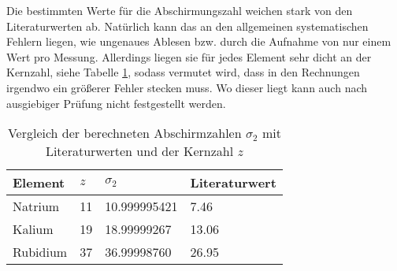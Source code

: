 Die bestimmten Werte für die Abschirmungszahl weichen stark von den Literaturwerten \cite{deGruyter} ab. Natürlich kann das an den allgemeinen systematischen Fehlern liegen, wie ungenaues Ablesen bzw. durch die Aufnahme von nur einem Wert pro Messung. Allerdings liegen sie für jedes Element sehr dicht an der Kernzahl, siehe Tabelle \ref{tab:Literatur}, sodass vermutet wird, dass in den Rechnungen irgendwo ein größerer Fehler stecken muss. Wo dieser liegt kann auch nach ausgiebiger Prüfung nicht festgestellt werden.
\begin{table}[h!]
	\centering
	\caption{Vergleich der berechneten Abschirmzahlen $\sigma_2$ mit Literaturwerten und der Kernzahl $z$}
	\label{tab:Literatur}
	\begin{tabular}{l|lll}
		\toprule
		Element & $z$ & $\sigma_2$ & Literaturwert \\
		\midrule
		Natrium & 11 & 10.999995421 & 7.46 \\
		Kalium & 19 & 18.99999267 & 13.06 \\
		Rubidium & 37 & 36.99998760 & 26.95 \\
		\bottomrule
	\end{tabular}
\end{table}

